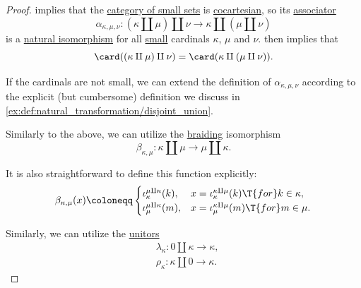\begin{proof}
    implies that the \hyperref[def:category_of_small_sets]{category of small sets} is \hyperref[def:cocartesian_monoidal_category]{cocartesian}, so its \hyperref[def:monoidal_category/associator]{associator}
  \begin{equation*}
     \alpha_{\kappa,\mu,\nu}: (\kappa \amalg \mu) \amalg \nu \to \kappa \amalg (\mu \amalg \nu)
  \end{equation*}
  is a \hyperref[thm:natural_isomorphism]{natural isomorphism} for all \hyperref[def:small_set]{small} cardinals \( \kappa \), \( \mu \) and \( \nu \).  then implies that
  \begin{equation*}
    \card((\kappa \amalg \mu) \amalg \nu) = \card(\kappa \amalg (\mu \amalg \nu)).
  \end{equation*}

  If the cardinals are not small, we can extend the definition of \( \alpha_{\kappa,\mu,\nu} \) according to the explicit (but cumbersome) definition we discuss in \cref{ex:def:natural_transformation/disjoint_union}.

   Similarly to the above, we can utilize the \hyperref[def:symmetric_monoidal_category]{braiding} isomorphism
  \begin{equation*}
    \beta_{\kappa,\mu}: \kappa \amalg \mu \to \mu \amalg \kappa.
  \end{equation*}

  It is also straightforward to define this function explicitly:
  \begin{equation*}
    \beta_{\kappa,\mu}(x) \coloneqq \begin{cases}
      \iota_\kappa^{\mu \amalg \kappa}(k), &x = \iota_\kappa^{\kappa \amalg \mu}(k) \T{for} k \in \kappa, \\
      \iota_\mu^{\mu \amalg \kappa}(m),    &x = \iota_\mu^{\kappa \amalg \mu}(m) \T{for} m \in \mu.
    \end{cases}
  \end{equation*}

   Similarly, we can utilize the \hyperref[def:monoidal_category/unitors]{unitors}
  \begin{align*}
    &\lambda_\kappa: 0 \amalg \kappa \to \kappa, \\
    &\rho_\kappa: \kappa \amalg 0 \to \kappa.
  \end{align*}


\end{proof}
